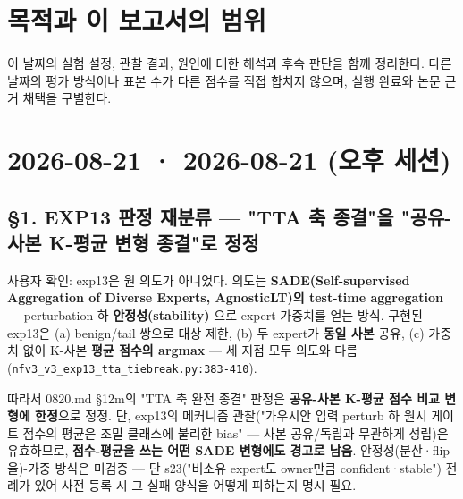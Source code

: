 




\section*{목적과 이 보고서의 범위}

이 날짜의 실험 설정, 관찰 결과, 원인에 대한 해석과 후속 판단을 함께 정리한다. 다른 날짜의 평가 방식이나 표본 수가 다른 점수를 직접 합치지 않으며, 실행 완료와 논문 근거 채택을 구별한다.


\section{2026-08-21 · 2026-08-21 (오후 세션)}
\label{report:20260821_0821}
\subsection{§1. EXP13 판정 재분류 — "TTA 축 종결"을 "공유-사본 K-평균 변형 종결"로 정정}
사용자 확인: exp13은 원 의도가 아니었다. 의도는 \textbf{SADE(Self-supervised Aggregation of Diverse Experts, AgnosticLT)의 test-time aggregation} — perturbation 하 \textbf{안정성(stability)} 으로 expert 가중치를 얻는 방식. 구현된 exp13은 (a) benign/\allowbreak{}tail 쌍으로 대상 제한, (b) 두 expert가 \textbf{동일 사본} 공유, (c) 가중치 없이 K-사본 \textbf{평균 점수의 argmax} — 세 지점 모두 의도와 다름 (\texttt{nfv3\_\allowbreak{}\allowbreak{}v3\_\allowbreak{}\allowbreak{}exp13\_\allowbreak{}\allowbreak{}tt\allowbreak{}a\_\allowbreak{}\allowbreak{}tiebre\allowbreak{}ak.\allowbreak{}py:38\allowbreak{}3-\allowbreak{}410}).

따라서 0820.md §12m의 "TTA 축 완전 종결" 판정은 \textbf{공유-사본 K-평균 점수 비교 변형에 한정}으로 정정. 단, exp13의 메커니즘 관찰("가우시안 입력 perturb 하 원시 게이트 점수의 평균은 조밀 클래스에 불리한 bias" — 사본 공유/\allowbreak{}독립과 무관하게 성립)은 유효하므로, \textbf{점수-평균을 쓰는 어떤 SADE 변형에도 경고로 남음}. 안정성(분산·flip율)-가중 방식은 미검증 — 단 s23("비소유 expert도 owner만큼 confident·stable") 전례가 있어 사전 등록 시 그 실패 양식을 어떻게 피하는지 명시 필요.

